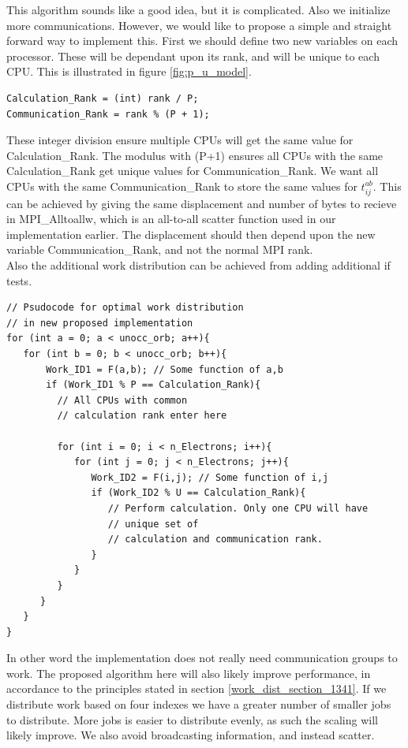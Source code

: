 \documentclass[a4paper,norsk,11pt,twoside]{report}
\begin{document}
This algorithm sounds like a good idea, but it is complicated. Also we initialize more communications. However, we would like to propose a simple and straight forward way to implement this. First we should define two new variables on each processor. These will be dependant upon its rank, and will be unique to each CPU. This is illustrated in figure \ref{fig:p_u_model}.

\begin{lstlisting}
Calculation_Rank = (int) rank / P;
Communication_Rank = rank % (P + 1);
\end{lstlisting}
These integer division ensure multiple CPUs will get the same value for Calculation\_Rank. The modulus with (P+1) ensures all CPUs with the same Calculation\_Rank get unique values for Communication\_Rank. We want all CPUs with the same Communication\_Rank to store the same values for $t_{ij}^{ab}$. This can be achieved by giving the same displacement and number of bytes to recieve in MPI\_Alltoallw, which is an all-to-all scatter function used in our implementation earlier. The displacement should then depend upon the new variable Communication\_Rank, and not the normal MPI rank. \\

Also the additional work distribution can be achieved from adding additional if tests.

\begin{lstlisting}
// Psudocode for optimal work distribution
// in new proposed implementation
for (int a = 0; a < unocc_orb; a++){
   for (int b = 0; b < unocc_orb; b++){
       Work_ID1 = F(a,b); // Some function of a,b
       if (Work_ID1 % P == Calculation_Rank){
         // All CPUs with common 
         // calculation rank enter here
         
         for (int i = 0; i < n_Electrons; i++){
            for (int j = 0; j < n_Electrons; j++){
               Work_ID2 = F(i,j); // Some function of i,j
               if (Work_ID2 % U == Calculation_Rank){
                  // Perform calculation. Only one CPU will have 
                  // unique set of 
                  // calculation and communication rank.
               }
            }
         }
      }
   }
}
\end{lstlisting}
In other word the implementation does not really need communication groups to work. The proposed algorithm here will also likely improve performance, in accordance to the principles stated in section \ref{work_dist_section_1341}. If we distribute work based on four indexes we have a greater number of smaller jobs to distribute. More jobs is easier to distribute evenly, as such the scaling will likely improve. We also avoid broadcasting information, and instead scatter. \\
\end{document}
